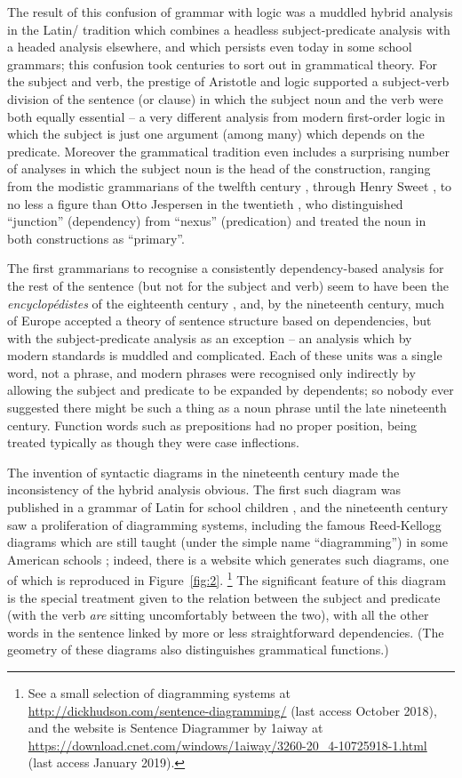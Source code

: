 \documentclass[output=paper
 	        ,biblatex
                ,babelshorthands
                ,newtxmath
                ,draftmode
                ,colorlinks, citecolor=brown
]{langscibook}
\begin{document}
The result of this confusion of grammar with logic was a muddled hybrid analysis in the Latin/ tradition which combines a headless subject-predicate analysis with a headed analysis elsewhere, and which persists even today in some school grammars; this confusion took centuries to sort out in grammatical theory. For the subject and verb, the prestige of Aristotle and logic supported a subject-verb division of the sentence (or clause) in which the subject noun and the verb were both equally essential – a very different analysis from modern first-order logic in which the subject is just one argument (among many) which depends on the predicate. Moreover the grammatical tradition even includes a surprising number of analyses in which the subject noun is the head of the construction, ranging from the modistic grammarians of the twelfth century \citep[83]{Robins1967}, through Henry Sweet \citep[17]{Sweet1891}, to no less a figure than Otto Jespersen in the twentieth \citep{Jespersen37a-u}, who distinguished ``junction'' (dependency) from ``nexus'' (predication) and treated the noun in both constructions as ``primary''.

The first grammarians to recognise a consistently dependency-based analysis for the rest of the sentence (but not for the subject and verb) seem to have been the  \emph{encyclopédistes} of the eighteenth century \citep{KahaneTBA}, and, by the nineteenth century, much of Europe accepted a theory of sentence structure based on dependencies, but with the subject-predicate analysis as an exception – an analysis which by modern standards is muddled and complicated. Each of these units was a single word, not a phrase, and modern phrases were recognised only indirectly by allowing the subject and predicate to be expanded by dependents; so nobody ever suggested there might be such a thing as a noun phrase until the late nineteenth century. Function words such as prepositions had no proper position, being treated typically as though they were case inflections.

The invention of syntactic diagrams in the nineteenth century made the inconsistency of the hybrid analysis obvious. The first such diagram was published in a  grammar of Latin for school children \citep{Billroth1832}, and the nineteenth century saw a proliferation of diagramming systems, including the famous Reed-Kellogg diagrams which are still taught (under the simple name ``diagramming'') in some American schools \citep{ReedKellog1890}; indeed, there is a website which generates such diagrams, one of which is reproduced in Figure~\ref{fig:2}.%
%
\footnote{See a small selection of diagramming systems at \url{http://dickhudson.com/sentence-diagramming/} (last access October 2018), and the website is Sentence Diagrammer by 1aiway at \url{https://download.cnet.com/windows/1aiway/3260-20_4-10725918-1.html} (last access January 2019).}
%
The significant feature of this diagram is the special treatment given to the relation between the subject and predicate (with the verb \emph{are} sitting uncomfortably between the two), with all the other words in the sentence linked by more or less straightforward dependencies. (The geometry of these diagrams also distinguishes grammatical functions.)
 
\end{document}
